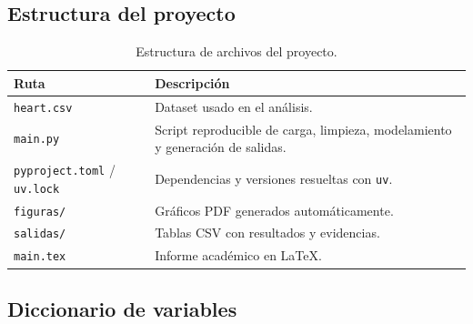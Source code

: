 \documentclass[10pt,a4paper]{article}
\begin{document}
\subsection{Estructura del proyecto}

\begin{table}[H]
\centering
\small
\begin{tabularx}{\textwidth}{p{4.2cm}X}
\toprule
Ruta & Descripción \\
\midrule
\texttt{heart.csv} & Dataset usado en el análisis. \\
\texttt{main.py} & Script reproducible de carga, limpieza, modelamiento y generación de salidas. \\
\texttt{pyproject.toml} / \texttt{uv.lock} & Dependencias y versiones resueltas con \texttt{uv}. \\
\texttt{figuras/} & Gráficos PDF generados automáticamente. \\
\texttt{salidas/} & Tablas CSV con resultados y evidencias. \\
\texttt{main.tex} & Informe académico en LaTeX. \\
\bottomrule
\end{tabularx}
\caption{Estructura de archivos del proyecto.}
\label{tab:estructura}
\end{table}

\subsection{Diccionario de variables}
\end{document}
